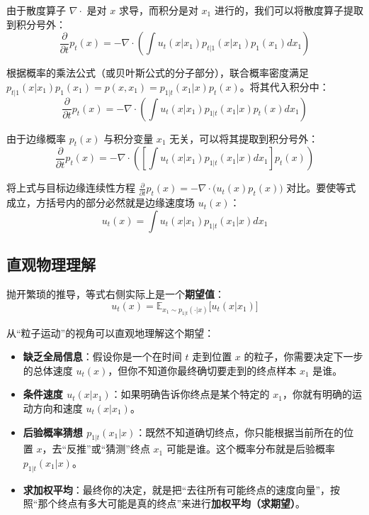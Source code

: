 由于散度算子 $\nabla \cdot$ 是对 $x$ 求导，而积分是对 $x_1$ 进行的，我们可以将散度算子提取到积分号外：
\begin{equation}
    \frac{\partial}{\partial t} p_t(x) = -\nabla \cdot \left( \int u_t(x|x_1) p_{t|1}(x|x_1) p_1(x_1) dx_1 \right)
\end{equation}

根据概率的乘法公式（或贝叶斯公式的分子部分），联合概率密度满足 $p_{t|1}(x|x_1) p_1(x_1) = p(x, x_1) = p_{1|t}(x_1|x) p_t(x)$。将其代入积分中：
\begin{equation}
    \frac{\partial}{\partial t} p_t(x) = -\nabla \cdot \left( \int u_t(x|x_1) p_{1|t}(x_1|x) p_t(x) dx_1 \right)
\end{equation}

由于边缘概率 $p_t(x)$ 与积分变量 $x_1$ 无关，可以将其提取到积分号外：
\begin{equation}
    \frac{\partial}{\partial t} p_t(x) = -\nabla \cdot \left( \left[ \int u_t(x|x_1) p_{1|t}(x_1|x) dx_1 \right] p_t(x) \right)
\end{equation}

将上式与目标边缘连续性方程 $\frac{\partial}{\partial t} p_t(x) = -\nabla \cdot \big(u_t(x) p_t(x)\big)$ 对比。要使等式成立，方括号内的部分必然就是边缘速度场 $u_t(x)$：
\begin{equation}
    u_t(x) = \int u_t(x|x_1) p_{1|t}(x_1|x) dx_1
\end{equation}

\subsection{ 直观物理理解}

抛开繁琐的推导，等式右侧实际上是一个\textbf{期望值}：
\begin{equation}
    u_t(x) = \mathbb{E}_{x_1 \sim p_{1|t}(\cdot|x)} \big[ u_t(x|x_1) \big]
\end{equation}

从“粒子运动”的视角可以直观地理解这个期望：
\begin{itemize}
    \item \textbf{缺乏全局信息}：假设你是一个在时间 $t$ 走到位置 $x$ 的粒子，你需要决定下一步的总体速度 $u_t(x)$，但你不知道你最终确切要走到的终点样本 $x_1$ 是谁。
    \item \textbf{条件速度 $u_t(x|x_1)$}：如果明确告诉你终点是某个特定的 $x_1$，你就有明确的运动方向和速度 $u_t(x|x_1)$。
    \item \textbf{后验概率猜想 $p_{1|t}(x_1|x)$}：既然不知道确切终点，你只能根据当前所在的位置 $x$，去“反推”或“猜测”终点 $x_1$ 可能是谁。这个概率分布就是后验概率 $p_{1|t}(x_1|x)$。
    \item \textbf{求加权平均}：最终你的决定，就是把“去往所有可能终点的速度向量”，按照“那个终点有多大可能是真的终点”来进行\textbf{加权平均（求期望）}。
\end{itemize}

